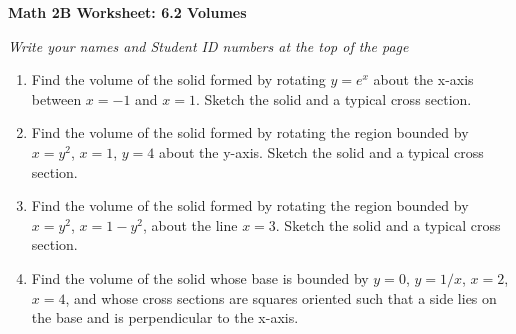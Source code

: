 \documentclass[12pt,fleqn]{article}
\begin{document}
\begin{center}
	\textbf{Math 2B Worksheet: 6.2 Volumes}
\end{center}

\emph{Write your names and Student ID numbers at the top of the page}

\begin{enumerate}

\item Find the volume of the solid formed by rotating $y=e^x$ about the x-axis between $x=-1$ and $x=1$.  Sketch the solid and a typical cross section.
\vfill

\item Find the volume of the solid formed by rotating the region bounded by $x=y^2$, $x=1$, $y=4$ about the y-axis.  Sketch the solid and a typical cross section.
\vfill


\newpage 
\item Find the volume of the solid formed by rotating the region bounded by $x=y^2$, $x=1-y^2$, about the line $x=3$.  Sketch the solid and a typical cross section.
\vfill


\item Find the volume of the solid whose base is bounded by $y=0$, $y=1/x$, $x=2$, $x=4$, and whose cross sections are squares oriented such that a side lies on the base and is perpendicular to the x-axis. 
\end{enumerate}
\vfill
\end{document}
